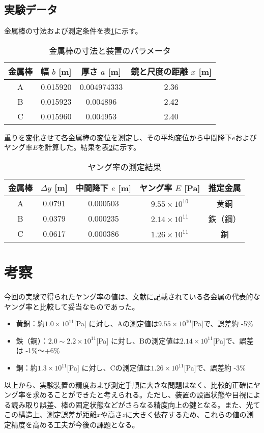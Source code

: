 \documentclass[a4paper,11pt,dvipdfmx]{jsarticle}
\begin{document}
\subsection{実験データ}
金属棒の寸法および測定条件を表\ref{tbl:specs}に示す。

\renewcommand{\arraystretch}{1.2}
\begin{table}[H]
\centering
\caption{金属棒の寸法と装置のパラメータ}
\label{tbl:specs}
\begin{tabular}{|c|c|c|c|}
\hline
金属棒 & 幅 \( b \) [m] & 厚さ \( a \) [m] & 鏡と尺度の距離 \( x \) [m] \\ \hline
A & 0.015920 & 0.004974333 & 2.36 \\ \hline
B & 0.015923 & 0.004896     & 2.42 \\ \hline
C & 0.015960 & 0.004953     & 2.40 \\ \hline
\end{tabular}
\end{table}

重りを変化させて各金属棒の変位を測定し、その平均変位から中間降下\( e \)およびヤング率\( E \)を計算した。結果を表\ref{tbl:young}に示す。

\begin{table}[H]
\centering
\caption{ヤング率の測定結果}
\label{tbl:young}
\begin{tabular}{|c|c|c|c|c|}
\hline
金属棒 & \( \Delta y \) [m] & 中間降下 \( e \) [m] & ヤング率 \( E \) [Pa] & 推定金属 \\ \hline
A & 0.0791 & 0.000503 & \( 9.55 \times 10^{10} \) & 黄銅 \\ \hline
B & 0.0379 & 0.000235 & \( 2.14 \times 10^{11} \) & 鉄（鋼） \\ \hline
C & 0.0617 & 0.000386 & \( 1.26 \times 10^{11} \) & 銅 \\ \hline
\end{tabular}
\end{table}

\section{考察}
今回の実験で得られたヤング率の値は、文献に記載されている各金属の代表的なヤング率と比較して妥当なものであった。
\begin{itemize}
  \item 黄銅：約\( 1.0 \times 10^{11} \)[Pa] に対し、Aの測定値は\( 9.55 \times 10^{10} \)[Pa]で、誤差約 -5\%
  \item 鉄（鋼）：\( 2.0 \sim 2.2 \times 10^{11} \)[Pa] に対し、Bの測定値は\( 2.14 \times 10^{11} \)[Pa]で、誤差は -1\%〜+6\%
  \item 銅：約\( 1.3 \times 10^{11} \)[Pa] に対し、Cの測定値は\( 1.26 \times 10^{11} \)[Pa]で、誤差約 -3\%
\end{itemize}

以上から、実験装置の精度および測定手順に大きな問題はなく、比較的正確にヤング率を求めることができたと考えられる。ただし、装置の設置状態や目視による読み取り誤差、棒の固定状態などがさらなる精度向上の鍵となる。また、光てこの構造上、測定誤差が距離\( x \)や高さ\( z \)に大きく依存するため、これらの値の測定精度を高める工夫が今後の課題となる。
\end{document}
